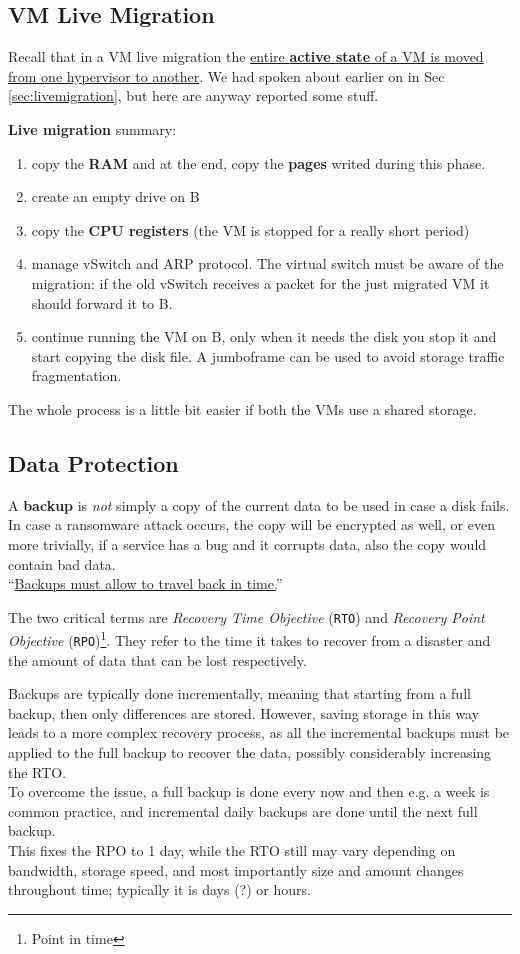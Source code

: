 \subsection{VM Live Migration}
Recall that in a VM live migration the \ul{entire \textbf{active state} of a VM is moved
from one hypervisor to another}.
We had spoken about earlier on in Sec \ref{sec:livemigration}, but here are anyway reported some stuff.
{\textbf{Live migration} summary:\ns
\begin{enumerate}
\item
  copy the \textbf{RAM} and at the end, copy the \textbf{pages} writed
  during this phase.
\item
  create an empty drive on B
\item
  copy the \textbf{CPU registers} (the VM is stopped for a really short
  period)
\item
  manage vSwitch and ARP protocol. The virtual switch must be aware of
  the migration: if the old vSwitch receives a packet for the just
  migrated VM it should forward it to B.
\item
  continue running the VM on B, only when it needs the disk you stop it
  and start copying the disk file. A jumboframe can be used to avoid
  storage traffic fragmentation.
\end{enumerate}}

The whole process is a little bit easier if both the VMs use a shared
storage.

\subsection{Data Protection}
\label{sec:dataprotection}
A \textbf{backup} is \textit{not} simply a copy of the current data to be used in case a disk fails. In case a ransomware attack occurs, the copy will be encrypted as well, or even more trivially, if a service has a bug and it corrupts data, also the copy would contain bad data.\\
``\ul{Backups must allow to travel back in time.}''

The two critical terms are \textit{Recovery Time Objective} (\texttt{RTO}) and  \textit{Recovery Point Objective} (\texttt{RPO})\footnote{Point in time}.
They refer to the time it takes to recover from a disaster and the amount of data that can be lost respectively.

Backups are typically done incrementally, meaning that starting from a full backup, then only differences are stored.
However, saving storage in this way leads to a more complex recovery process, as all the incremental backups must be applied to the full backup to recover the data, possibly considerably increasing the RTO.\\
To overcome the issue, a full backup is done every now and then e.g. a week is common practice, and incremental daily backups are done until the next full backup.\\
This fixes the RPO to 1 day, while the RTO still may vary depending on bandwidth, storage speed, and most importantly size and amount changes throughout time; typically it is days (?) or hours.


